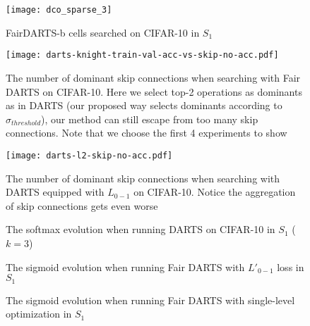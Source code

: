 \documentclass[runningheads]{llncs}
\begin{document}
\begin{figure}[ht]
	\centering
	\texttt{[image: dco\_sparse\_3]}
\caption{FairDARTS-b cells searched on CIFAR-10 in $S_1$}
	\label{fig:fairdarts-b-normal-reduce-architecture}
\end{figure}

\begin{figure}[ht]
	\centering
	\texttt{[image: darts-knight-train-val-acc-vs-skip-no-acc.pdf]}
\caption{The number of dominant skip connections when searching with Fair DARTS on CIFAR-10. Here we select top-2 operations as dominants as in DARTS (our proposed way selects dominants according to $\sigma_{threshold}$), our method can still escape from too many skip connections. Note that we choose the first 4 experiments to show}
	\label{fig:num-skip-cifar-fair-darts}
\end{figure}

\begin{figure}[ht]
	\centering
	\texttt{[image: darts-l2-skip-no-acc.pdf]}
\caption{The number of dominant skip connections when searching with DARTS equipped with $L_{0-1}$ on CIFAR-10. Notice the aggregation of skip connections gets even worse}
	\label{fig:darts-l2-skip-no-acc}
\end{figure}




\begin{figure*}[ht]
	\centering
	\caption{The softmax evolution when running DARTS on CIFAR-10 in $S_1$ ($k=3$)}
	\label{fig:darts-softmax-all-s1}
\end{figure*}


\begin{figure*}[ht]
	\centering
	\caption{The sigmoid evolution when running Fair DARTS with $L'_{0-1}$ loss in $S_1$}
	\label{fig:l1-alpha}
\end{figure*}

\begin{figure*}[ht]
	\centering
	\caption{The sigmoid evolution when running Fair DARTS with single-level optimization in $S_1$}
	\label{fig:single-alpha}
\end{figure*}
\end{document}
